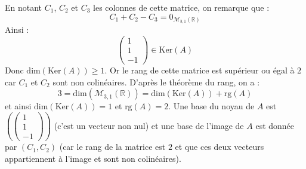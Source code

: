 \documentclass[a4paper,twoside,french,11pt]{VcCours}
\begin{document}
\begin{Exercice}{}\end{Exercice}En notant $C_1$, $C_2$ et $C_3$ les colonnes de cette matrice, on remarque que :
$$C_1+C_2-C_3 = 0_{\mathcal{M}_{3,1}(\mathbb{R})}$$
Ainsi :
$$ \begin{pmatrix}
1 \\
1 \\
-1 
\end{pmatrix} \in \textrm{Ker}(A) $$
Donc $\textrm{dim}(\textrm{Ker}(A)) \geq 1$. Or le rang de cette matrice est supérieur ou égal à $2$ car $C_1$ et $C_2$ sont non colinéaires. D'après le théorème du rang, on a :
$$ 3=\textrm{dim}(\mathcal{M}_{3,1}(\mathbb{R})) = \textrm{dim}(\textrm{Ker}(A)) + \textrm{rg}(A)$$
et ainsi $\textrm{dim}(\textrm{Ker}(A)) = 1$ et $\textrm{rg}(A)=2$. Une base du noyau de $A$ est $\left(  \begin{pmatrix}
1 \\
1 \\
-1 
\end{pmatrix} \right)$ (c'est un vecteur non nul) et une base de l'image de $A$ est donnée par $(C_1,C_2)$ (car le rang de la matrice est $2$ et que ces deux vecteurs appartiennent à l'image et sont non colinéaires).




\begin{Exercice}{}\end{Exercice}
\end{document}
